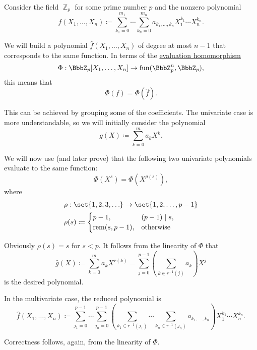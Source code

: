 \begin{algorithm}\label{alg:finite_field_polynomial_reduction}
  Consider the field \( \BbbZ_p \) for some prime number \( p \) and the nonzero polynomial
  \begin{equation*}
    f(X_1, \ldots, X_n) \coloneqq \sum_{k_1=0}^{m_1} \cdots \sum_{k_n=0}^{m_n} a_{k_1,\ldots,k_n} X_1^{k_1} \cdots X_n^{k_n}.
  \end{equation*}

  We will build a polynomial \( \hat f(X_1, \ldots, X_n) \) of degree at most \( n - 1 \) that corresponds to the same function. In terms of the \hyperref[thm:polynomial_ring_universal_property]{evaluation homomorphism}
  \begin{equation*}
    \Phi: \BbbZ_p[X_1, \ldots, X_n] \to \fun(\BbbZ_p^n, \BbbZ_p),
  \end{equation*}
  this means that
  \begin{equation*}
    \Phi(f) = \Phi(\hat f).
  \end{equation*}

  This can be achieved by grouping some of the coefficients. The univariate case is more understandable, so we will initially consider the polynomial
  \begin{equation*}
    g(X) \coloneqq \sum_{k=0}^m a_k X^k.
  \end{equation*}

  We will now use (and later prove) that the following two univariate polynomials evaluate to the same function:
  \begin{equation}\label{eq:alg:finite_field_polynomial_reduction/reduction}
    \Phi(X^s) = \Phi(X^{\rho(s)}),
  \end{equation}
  where
  \begin{align*}
    &\rho: \set{ 1, 2, 3, \ldots } \to \set{ 1, 2, \ldots, p - 1 } \\
    &\rho(s) \coloneqq \begin{cases}
      p - 1,          &(p - 1) \mid s, \\
      \rem(s, p - 1), &\T{otherwise}
    \end{cases}
  \end{align*}

  Obviously \( \rho(s) = s \) for \( s < p \). It follows from the linearity of \( \Phi \) that
  \begin{equation*}
    \hat g(X)
    \coloneqq
    \sum_{k=0}^m a_k X^{r(k)}
    =
    \sum_{j=0}^{p-1} \left( \sum_{k \in r^{-1}(j)} a_k \right) X^j
  \end{equation*}
  is the desired polynomial.

  In the multivariate case, the reduced polynomial is
  \begin{equation*}
    \hat f(X_1, \ldots, X_n) \coloneqq \sum_{j_1=0}^{p-1} \cdots \sum_{j_n=0}^{p-1} \left( \sum_{k_1 \in r^{-1}(j_1)} \cdots \sum_{k_n \in r^{-1}(j_n)} a_{k_1,\ldots,k_n} \right) X_1^{k_1} \cdots X_n^{k_n}.
  \end{equation*}

  Correctness follows, again, from the linearity of \( \Phi \).
\end{algorithm}

